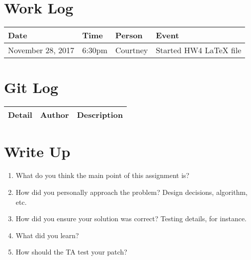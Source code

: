 \documentclass[letterpaper,10pt,draftclsnofoot,onecolumn,titlepage]{IEEEtran}
\begin{document}
\section{Work Log}
\begin{center}
\begin{tabular}{p{3cm}p{1cm}p{1cm}p{10cm} }
 Date  & Time & Person & Event \\ \hline
November 28, 2017 & 6:30pm & Courtney & Started HW4 LaTeX file \\
\end{tabular}
\end{center}

\section{Git Log}
\begin{tabular}{p{2cm} p{2cm} p{10cm}}\textbf{Detail} & \textbf{Author} & \textbf{Description}\\\hline
\end{tabular}

\section{Write Up}
\begin{enumerate}
                \item What do you think the main point of this assignment is? \\
                \item How did you personally approach the problem? Design decisions, algorithm, etc. \\

                \item How did you ensure your solution was correct? Testing details, for instance. \\
                \item What did you learn? \\
		\item How should the TA test your patch? \\
\end{enumerate}
\end{document}
